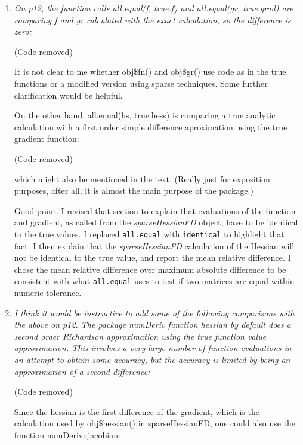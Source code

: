 \documentclass{article}
\newcommand{\code}[1]{\texttt{#1}}
\newcommand{\func}[1]{\code{#1}}
\newcommand{\class}[1]{\textsl{#1}}
\newenvironment{revQuote}{\itshape}{\vspace{\baselineskip}}
\newenvironment{response}{\normalfont}{\vspace{\baselineskip}}
\begin{document}
\begin{enumerate}[align=left]
\item \begin{revQuote}
On p12, the function calls all.equal(f, true.f) and all.equal(gr,
true.grad) are comparing f and gr calculated with the exact calculation, so
the difference is zero:


(Code removed)


It is not clear to me whether obj\$fn() and obj\$gr() use code as in the true
functions or a modified version using sparse techniques. Some further
clarification would be helpful.

On the other hand, all.equal(hs, true.hess) is comparing a true analytic
calculation with a first order simple difference aproximation using the true
gradient function:

(Code removed)

which might also be mentioned in the text. (Really just for exposition
purposes, after all, it is almost the main purpose of the package.)
  \end{revQuote}

\begin{response}
  Good point.  I revised that section to explain that evaluations of
  the function and gradient, as called from the
  \class{sparseHessianFD} object, have to be identical to the true values.
  I replaced \func{all.equal} with \func{identical} to
  highlight that fact. I then explain that the
  \class{sparseHessianFD} calculation of the Hessian will not be
  identical to the true value, and report the mean relative
  difference.  I chose the mean relative difference over maximum
  absolute difference to be consistent with what \func{all.equal}
  uses to test if two matrices are equal within numeric tolerance.
\end{response}


\item \label{it:complex1}\begin{revQuote}
I think it would be instructive to add some of the following comparisons
with the above on p12.  The package numDeriv function hessian by default
does a second order Richardson approximation using the true function value
approximation. This involves a very large number of function evaluations in
an attempt to obtain some accuracy, but the accuracy is limited by being an
approximation of a second difference:

(Code removed)

Since the hessian is the first difference of the gradient, which is the
calculation used by obj\$hessian() in sparseHessianFD, one could also use the
function numDeriv::jacobian:


\end{revQuote}
\end{enumerate}
\end{document}

